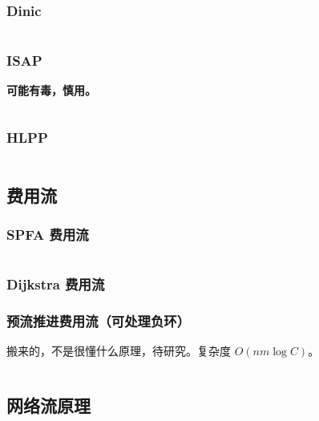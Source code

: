 \documentclass[a4paper, twoside]{article}
\begin{document}
\begin{multicols}{2}
				\subsubsection{Dinic}
					\inputminted{cpp}{../src/graph/Dinic.cpp}

				\subsubsection{ISAP}
					\textbf{可能有毒，慎用。}
					\inputminted{cpp}{../src/graph/ISAP.cpp}

				\subsubsection[最高标号预流推进 HLPP]{HLPP}
					\inputminted{cpp}{../src/graph/HLPP.cpp}
			
			\subsection{费用流}
				\subsubsection{SPFA 费用流}
					\inputminted{cpp}{../src/graph/SPFA费用流.cpp}

				\subsubsection{Dijkstra 费用流}
					
				
				\subsubsection{预流推进费用流（可处理负环）}

					搬来的，不是很懂什么原理，待研究。复杂度 $O(nm \log C)$。

					\inputminted{cpp}{../src/graph/预流推进费用流.cpp}



			

			\subsection{网络流原理}
				
			

\end{multicols}
\end{document}
